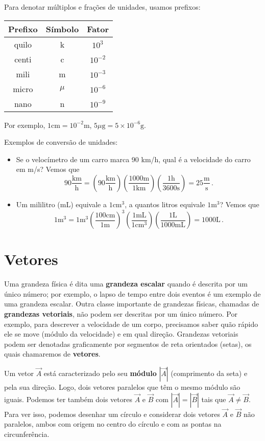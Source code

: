 \documentclass[12pt, a4paper]{article}
\newcommand{\dpar}[1]{\left(#1\right)}
\newcommand{\un}[1]{\mathrm{#1}}
\begin{document}
Para denotar múltiplos e frações de unidades, usamos prefixos:

\begin{center}
	\begin{tabular}{c|c|c}
		Prefixo&Símbolo&Fator\\\hline
		quilo&k&$10^3$\\
		centi&c&$10^{-2}$\\
		mili&m&$10^{-3}$\\
		micro&$\mu$&$10^{-6}$\\
		nano&n&$10^{-9}$
	\end{tabular}
\end{center}
Por exemplo, $1\un{cm}=10^{-2}\un{m}$, $5\mu\un{g}=5\times10^{-6}\un{g}$.

Exemplos de conversão de unidades: 
\begin{itemize}
	\item Se o velocímetro de um carro marca 90 km/h, qual é a velocidade do carro em m/s? Vemos que
	$$90 \frac{\un{km}}{\un{h}}=\dpar{90 \frac{\un{km}}{\un{h}}}\dpar{\frac{1000\un{m}}{1\un{km}}}\dpar{\frac{1\un{h}}{3600\un{s}}}=25\frac{\un{m}}{\un{s}}\,.$$
	\item Um mililitro (mL) equivale a $1\un{cm}^3$, a quantos litros equivale $1\un{m}^3$? Vemos que
	$$1\un{m}^3=1\un{m}^3\dpar{\frac{100\un{cm}}{1\un{m}}}^3\dpar{\frac{1\un{mL}}{1\un{cm}^3}}\dpar{\frac{1\un{L}}{1000\un{mL}}}=1000\un{L}\,.$$
\end{itemize}


\section{Vetores}
Uma grandeza física é dita uma \textbf{grandeza escalar} quando é descrita por um único número; por exemplo, o lapso de tempo entre dois eventos é um exemplo de uma grandeza escalar. Outra classe importante de grandezas físicas, chamadas de \textbf{grandezas vetoriais}, não podem ser descritas por um único número. Por exemplo, para descrever a velocidade de um corpo, precisamos saber quão rápido ele se move (módulo da velocidade) e em qual direção. Grandezas vetoriais podem ser denotadas graficamente por segmentos de reta orientados (setas), os quais chamaremos de \textbf{vetores}.

Um vetor $\vec{A}$ está caracterizado pelo seu \textbf{módulo} $|\vec{A}|$ (comprimento da seta) e pela sua direção. Logo, dois vetores paralelos que têm o mesmo módulo são iguais. Podemos ter também dois vetores $\vec A$ e $\vec B$ com $|\vec A|=|\vec B|$ tais que $\vec A\ne\vec B$. Para ver isso, podemos desenhar um círculo e considerar dois vetores $\vec A$ e $\vec B$ não paralelos, ambos com origem no centro do círculo e com as pontas na circunferência.
\end{document}
